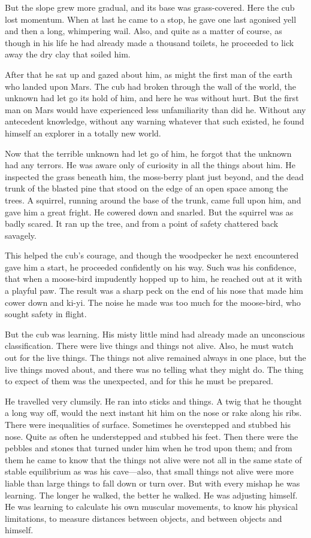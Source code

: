 \documentclass[10pt]{book}
\begin{document}
But the slope grew more gradual, and its base was grass-covered. Here
the cub lost momentum. When at last he came to a stop, he gave one last
agonised yell and then a long, whimpering wail. Also, and quite as a
matter of course, as though in his life he had already made a thousand
toilets, he proceeded to lick away the dry clay that soiled him.

After that he sat up and gazed about him, as might the first man of the
earth who landed upon Mars. The cub had broken through the wall of the
world, the unknown had let go its hold of him, and here he was without
hurt. But the first man on Mars would have experienced less
unfamiliarity than did he. Without any antecedent knowledge, without
any warning whatever that such existed, he found himself an explorer in
a totally new world.

Now that the terrible unknown had let go of him, he forgot that the
unknown had any terrors. He was aware only of curiosity in all the
things about him. He inspected the grass beneath him, the moss-berry
plant just beyond, and the dead trunk of the blasted pine that stood on
the edge of an open space among the trees. A squirrel, running around
the base of the trunk, came full upon him, and gave him a great fright.
He cowered down and snarled. But the squirrel was as badly scared. It
ran up the tree, and from a point of safety chattered back savagely.

This helped the cub’s courage, and though the woodpecker he next
encountered gave him a start, he proceeded confidently on his way. Such
was his confidence, that when a moose-bird impudently hopped up to him,
he reached out at it with a playful paw. The result was a sharp peck on
the end of his nose that made him cower down and ki-yi. The noise he
made was too much for the moose-bird, who sought safety in flight.

But the cub was learning. His misty little mind had already made an
unconscious classification. There were live things and things not
alive. Also, he must watch out for the live things. The things not
alive remained always in one place, but the live things moved about,
and there was no telling what they might do. The thing to expect of
them was the unexpected, and for this he must be prepared.

He travelled very clumsily. He ran into sticks and things. A twig that
he thought a long way off, would the next instant hit him on the nose
or rake along his ribs. There were inequalities of surface. Sometimes
he overstepped and stubbed his nose. Quite as often he understepped and
stubbed his feet. Then there were the pebbles and stones that turned
under him when he trod upon them; and from them he came to know that
the things not alive were not all in the same state of stable
equilibrium as was his cave—also, that small things not alive were more
liable than large things to fall down or turn over. But with every
mishap he was learning. The longer he walked, the better he walked. He
was adjusting himself. He was learning to calculate his own muscular
movements, to know his physical limitations, to measure distances
between objects, and between objects and himself.
\end{document}
